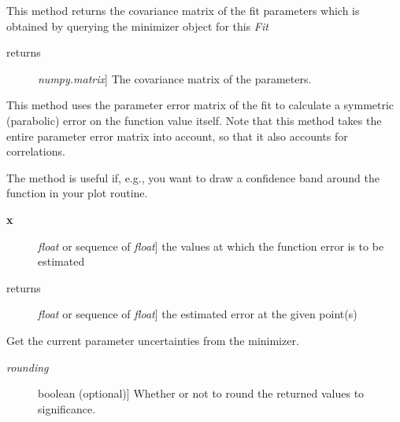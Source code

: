 \documentclass[a4paper,10pt,english]{sphinxmanual}
\begin{document}
\begin{fulllineitems}
\begin{fulllineitems}
\begin{description}
\end{description}

\end{fulllineitems}


\begin{fulllineitems}
\label{index:kafe.fit.Fit.get_error_matrix}
This method returns the covariance matrix of the fit parameters which
is obtained by querying the minimizer object for this \emph{Fit}
\begin{description}
\item[{returns}] \leavevmode{[}\emph{numpy.matrix}{]}
The covariance matrix of the parameters.

\end{description}

\end{fulllineitems}


\begin{fulllineitems}
\label{index:kafe.fit.Fit.get_function_error}
This method uses the parameter error matrix of the fit to calculate
a symmetric (parabolic) error on the function value itself. Note that
this method takes the entire parameter error matrix into account, so
that it also accounts for correlations.

The method is useful if, e.g., you want to draw a confidence band
around the function in your plot routine.
\begin{description}
\item[{\textbf{x}}] \leavevmode{[}\emph{float} or sequence of \emph{float}{]}
the values at which the function error is to be estimated

\item[{returns}] \leavevmode{[}\emph{float} or sequence of \emph{float}{]}
the estimated error at the given point(s)

\end{description}

\end{fulllineitems}


\begin{fulllineitems}
\label{index:kafe.fit.Fit.get_parameter_errors}
Get the current parameter uncertainties from the minimizer.
\begin{description}
\item[{\emph{rounding}}] \leavevmode{[}boolean (optional){]}
Whether or not to round the returned values to significance.


\end{description}
\end{fulllineitems}
\end{fulllineitems}
\end{document}
